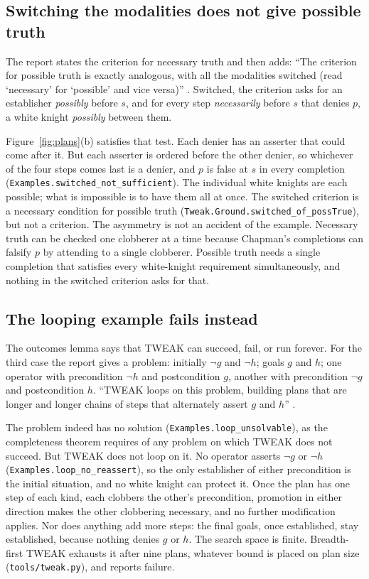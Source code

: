 \documentclass[11pt]{article}
\newcommand{\lean}[1]{\texttt{#1}}
\newcommand{\code}[1]{\texttt{#1}}
\begin{document}
\subsection{Switching the modalities does not give possible truth}

The report states the criterion for necessary truth and then adds: ``The
criterion for possible truth is exactly analogous, with all the modalities
switched (read `necessary' for `possible' and vice versa)''
\citep[p.~9]{chapman1985}. Switched, the criterion asks for an establisher
\emph{possibly} before $s$, and for every step \emph{necessarily} before
$s$ that denies $p$, a white knight \emph{possibly} between them.

Figure~\ref{fig:plans}(b) satisfies that test. Each denier has an asserter
that could come after it. But each asserter is ordered before the other
denier, so whichever of the four steps comes last is a denier, and $p$ is
false at $s$ in every completion (\lean{Examples.switched\_not\_sufficient}).
The individual white knights are each possible; what is impossible is to
have them all at once. The switched criterion is a necessary condition for
possible truth (\lean{Tweak.Ground.switched\_of\_possTrue}), but not a
criterion. The asymmetry is not an accident of the example. Necessary
truth can be checked one clobberer at a time because Chapman's completions
can falsify $p$ by attending to a single clobberer. Possible truth needs a
single completion that satisfies every white-knight requirement
simultaneously, and nothing in the switched criterion asks for that.

\subsection{The looping example fails instead}

The outcomes lemma says that TWEAK can succeed, fail, or run forever. For
the third case the report gives a problem: initially $\neg g$ and $\neg h$;
goals $g$ and $h$; one operator with precondition $\neg h$ and
postcondition $g$, another with precondition $\neg g$ and postcondition
$h$. ``TWEAK loops on this problem, building plans that are longer and
longer chains of steps that alternately assert $g$ and $h$''
\citep[p.~44]{chapman1985}.

The problem indeed has no solution (\lean{Examples.loop\_unsolvable}), as
the completeness theorem requires of any problem on which TWEAK does not
succeed. But TWEAK does not loop on it. No operator asserts $\neg g$ or
$\neg h$ (\lean{Examples.loop\_no\_reassert}), so the only establisher of
either precondition is the initial situation, and no white knight can
protect it. Once the plan has one step of each kind, each clobbers the
other's precondition, promotion in either direction makes the other
clobbering necessary, and no further modification applies. Nor does
anything add more steps: the final goals, once established, stay
established, because nothing denies $g$ or $h$. The search space is
finite. Breadth-first TWEAK exhausts it after nine plans, whatever bound is
placed on plan size (\code{tools/tweak.py}), and reports failure.
\end{document}

